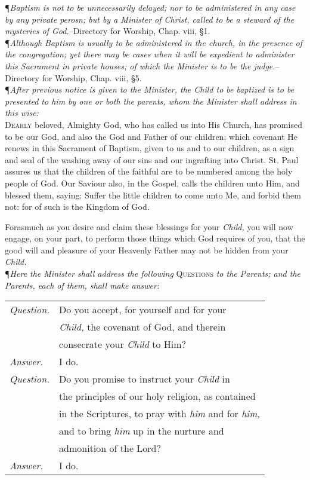 \P\textit{Baptism is not to be unnecessarily delayed; nor to be administered in any case by any private perosn; but by a Minister of Christ, called to be a steward of the mysteries of God.}--Directory for Worship, Chap. viii, \S 1. \\ 

\noindent\P\textit{Although Baptism is usually to be administered in the church, in the presence of the congregation; yet there may be cases when it will be expedient to administer this Sacrament in private houses; of which the Minister is to be the judge.}--Directory for Worship, Chap. viii, \S 5. \\ 

\noindent\P\textit{After previous notice is given to the Minister, the Child to be baptized is to be presented to him by one or both the parents, whom the Minister shall address in this wise:} \\ 

\lettrine{D}{early} beloved, Almighty God, who has called us into His Church, has promised to be our God, and also the God and Father of our children; which covenant He renews in this Sacrament of Baptism, given to us and to our children, as a sign and seal of the washing away of our sins and our ingrafting into Christ.
St. Paul assures us that the children of the faithful are to be numbered among the holy people of God.
Our Saviour also, in the Gospel, calls the children unto Him, and blessed them, saying: Suffer the little children to come unto Me, and forbid them not: for of such is the Kingdom of God.

Forasmuch as you desire and claim these blessings for your \textit{Child,} you will now engage, on your part, to perform those things which God requires of you, that the good will and pleasure of your Heavenly Father may not be hidden from your \textit{Child.} \\  

\noindent\P\textit{Here the Minister shall address the following} \textsc{Questions} \textit{to the Parents; and the Parents, each of them, shall make answer:} \\

\begin{tabular}{l l}
	\textit{Question.} & Do you accept, for yourself and for your \\
					& \textit{Child,} the covenant of God, and therein \\
					& consecrate your \textit{Child} to Him? \\
	\textit{Answer.} & I do. \\
	\textit{Question.} & Do you promise to instruct your \textit{Child} in \\
					& the principles of our holy religion, as contained \\
					& in the Scriptures, to pray with \textit{him} and for \textit{him,} \\
					& and to bring \textit{him} up in the nurture and \\
					& admonition of the Lord? \\    
	\textit{Answer.} & I do. \\
\end{tabular}
\vspace{1ex}

